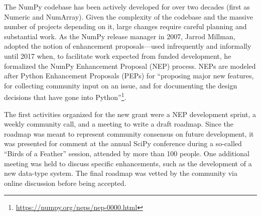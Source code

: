 The NumPy codebase has been actively developed for over two decades (first as
Numeric and NumArray).
Given the complexity of the codebase and the massive number of projects depending
on it, large changes require careful planning and substantial work.
As the NumPy release manager in 2007, Jarrod Millman, adopted the notion
of enhancement proposals---used infrequently and informally until 2017 when,
to facilitate work expected from funded development, he formalized the
NumPy Enhancement Proposal (NEP) process.  NEPs are modeled after
Python Enhancement Proposals (PEPs) for ``proposing major new
features, for collecting community input on an issue, and for
documenting the design decisions that have gone into
Python''\footnote{\url{https://numpy.org/neps/nep-0000.html}}.

The first activities organized for the new grant were a NEP development
sprint, a weekly community call, and a meeting to write a draft roadmap.
Since the roadmap was meant to represent community consensus on future
development, it was presented for comment at the annual SciPy
conference during a so-called ``Birds of a Feather'' session, attended
by more than 100 people.  One additional meeting was held to discuss
specific enhancements, such as the development of a new data-type
system.  The final roadmap was vetted by the community via online
discussion before being accepted.



